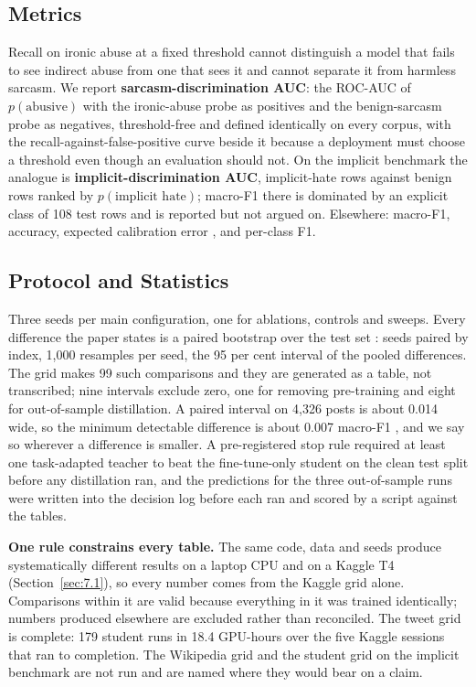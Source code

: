 \subsection{Metrics}
\label{sec:4.6}
Recall on ironic abuse at a fixed threshold cannot distinguish a model that fails to see indirect
abuse from one that sees it and cannot separate it from harmless sarcasm. We report
\textbf{sarcasm-discrimination AUC}: the ROC-AUC of $p(\text{abusive})$ with the ironic-abuse probe
as positives and the benign-sarcasm probe as negatives, threshold-free and defined identically on
every corpus, with the recall-against-false-positive curve beside it because a deployment must
choose a threshold even though an evaluation should not. On the implicit benchmark the analogue is
\textbf{implicit-discrimination AUC}, implicit-hate rows against benign rows ranked by
$p(\text{implicit hate})$; macro-F1 there is dominated by an explicit class of 108 test rows and is
reported but not argued on. Elsewhere: macro-F1, accuracy, expected calibration error
\cite{guo2017calibration}, and per-class F1.
\subsection{Protocol and Statistics}
\label{sec:4.7}
Three seeds per main configuration, one for ablations, controls and sweeps. Every difference the
paper states is a paired bootstrap over the test set \cite{koehn2004statistical,
dror2018hitchhiker}: seeds paired by index, 1,000 resamples per seed, the 95 per cent interval of
the pooled differences. The grid makes 99 such comparisons and they are generated as a table, not
transcribed; nine intervals exclude zero, one for removing pre-training and eight for out-of-sample
distillation. A paired interval on 4,326 posts is about 0.014 wide, so the minimum detectable
difference is about 0.007 macro-F1 \cite{card2020power}, and we say so wherever a difference is
smaller. A pre-registered stop rule required at least one task-adapted teacher to beat the
fine-tune-only student on the clean test split before any distillation ran, and the predictions for
the three out-of-sample runs were written into the decision log before each ran and scored by a
script against the tables.

\textbf{One rule constrains every table.} The same code, data and seeds produce systematically
different results on a laptop CPU and on a Kaggle T4 (Section~\ref{sec:7.1}), so every number comes
from the Kaggle grid alone. Comparisons within it are valid because everything in it was trained
identically; numbers produced elsewhere are excluded rather than reconciled. The tweet grid is
complete: 179 student runs in 18.4 GPU-hours over the five Kaggle sessions that ran to completion.
The Wikipedia grid and the student grid on the implicit benchmark are not run and are named where
they would bear on a claim.

